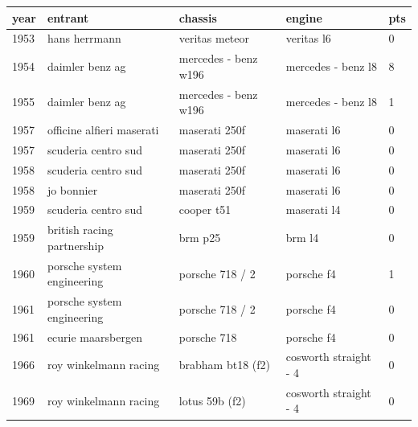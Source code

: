 \documentclass{article}
\begin{document}
\begin{tabular}{lllll}
\toprule
year & entrant & chassis & engine & pts \\
\midrule
1953 & hans herrmann & veritas meteor & veritas l6 & 0 \\
1954 & daimler benz ag & mercedes - benz w196 & mercedes - benz l8 & 8 \\
1955 & daimler benz ag & mercedes - benz w196 & mercedes - benz l8 & 1 \\
1957 & officine alfieri maserati & maserati 250f & maserati l6 & 0 \\
1957 & scuderia centro sud & maserati 250f & maserati l6 & 0 \\
1958 & scuderia centro sud & maserati 250f & maserati l6 & 0 \\
1958 & jo bonnier & maserati 250f & maserati l6 & 0 \\
1959 & scuderia centro sud & cooper t51 & maserati l4 & 0 \\
1959 & british racing partnership & brm p25 & brm l4 & 0 \\
1960 & porsche system engineering & porsche 718 / 2 & porsche f4 & 1 \\
1961 & porsche system engineering & porsche 718 / 2 & porsche f4 & 0 \\
1961 & ecurie maarsbergen & porsche 718 & porsche f4 & 0 \\
1966 & roy winkelmann racing & brabham bt18 (f2) & cosworth straight - 4 & 0 \\
1969 & roy winkelmann racing & lotus 59b (f2) & cosworth straight - 4 & 0 \\
\bottomrule
\end{tabular}
\end{document}

